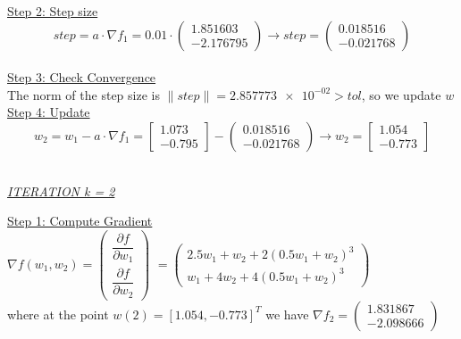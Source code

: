 \underline{Step 2: Step size}
\[
step = a \cdot \nabla f_{1} = 0.01 \cdot \left(\begin{array}{c}
1.851603 \\
-2.176795
\end{array}\right) \rightarrow step =\left(\begin{array}{c}
	0.018516 \\
	-0.021768
\end{array}\right)
\]
\\[4mm]

\underline{Step 3: Check Convergence}\\
The norm of the step size is $\| step \| = \num{2.857773e-02 }> tol$, so we update $w$
\\[4mm]

\underline{Step 4: Update}
\[ 
w_2 = w_1 - a\cdot \nabla f_1 =  \left[\begin{array}{c}
 1.073\\
-0.795
\end{array}\right] - \left(\begin{array}{c}
	0.018516 \\
	-0.021768
\end{array}\right) \rightarrow
w_2 = \left[\begin{array}{c}
	1.054\\
	-0.773
\end{array}\right]
\]
\\[4mm]

\begin{center}
	\underline{\textit{ITERATION k = 2}}
\end{center}

\underline{Step 1: Compute Gradient}\\
\(\nabla f(w_1,w_2) = \left(\begin{array}{c}
	\dfrac{\partial f}{\partial w_1} \\[4mm]
	\dfrac{\partial f}{\partial w_2}
\end{array}\right)\) $= \left(\begin{array}{c}
	2.5w_1 + w_2 + 2(0.5w_1+w_2)^3\\[1mm]
	w_1 + 4w_2 + 4(0.5w_1+w_2)^3
\end{array}\right)$ \\[3mm]

where at the point $w\left(2\right) = \left[1.054, -0.773\right]^T$ we have $\nabla f_{2} = \left(\begin{array}{c}
	1.831867 \\
	-2.098666
\end{array}\right)$
\\[4mm]

